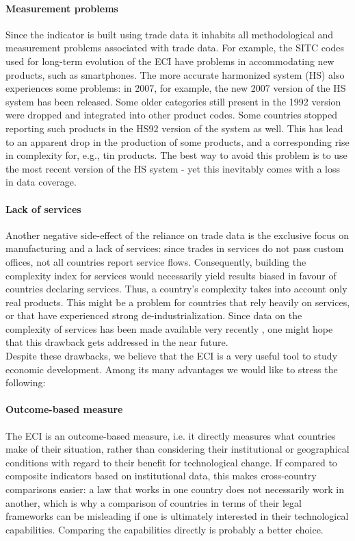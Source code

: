 \documentclass[11pt,a4paper]{article}
\begin{document}
\paragraph{Measurement problems}
Since the indicator is built using trade data it inhabits all methodological and measurement problems associated with trade data. 
For example, the SITC codes used for long-term evolution of the ECI have problems in accommodating new products, such as smartphones.
The more accurate harmonized system (HS) also experiences some problems: in 2007, for example, the new 2007 version of the HS system has been released. 
Some older categories still present in the 1992 version were dropped and integrated into other product codes.
Some countries stopped reporting such products in the HS92 version of the system as well.
This has lead to an apparent drop in the production of some products, and a corresponding rise in complexity for, e.g., tin products.
The best way to avoid this problem is to use the most recent version of the HS system - yet this inevitably comes with a loss in data coverage.

\paragraph{Lack of services} 
Another negative side-effect of the reliance on trade data is the exclusive focus on manufacturing and a lack of services:
since trades in services do not pass custom offices, not all countries report service flows. 
Consequently, building the complexity index for services would necessarily yield results biased in favour of countries declaring services.
Thus, a country's complexity takes into account only real products. 
This might be a problem for countries that rely heavily on services, or that have experienced strong de-industrialization.
Since data on the complexity of services has been made available very recently \citep{AtlasData}, one might hope that this drawback gets addressed in the near future.\\

Despite these drawbacks, we believe that the ECI is a very useful tool to study economic development. 
Among its many advantages we would like to stress the following:

\paragraph{Outcome-based measure}
The ECI is an outcome-based measure, i.e. it directly measures what countries make of their situation, rather than considering their institutional or geographical conditions with regard to their benefit for technological change.
If compared to composite indicators based on institutional data, this makes cross-country comparisons easier:
a law that works in one country does not necessarily work in another, which is why a comparison of countries in terms of their legal frameworks can be misleading if one is ultimately interested in their technological capabilities.
Comparing the capabilities directly is probably a better choice.
\end{document}
